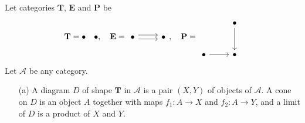 \begin{example}
Let categories  $\mathbf{T}$, $\mathbf{E}$ and $\mathbf{P}$ be
\begin{equation}
  \mathbf{T}={\bullet \quad \bullet},\quad \mathbf{E}=
  \begin{tikzcd}
    \bullet\arrow[r,shift left]\arrow[r,shift right]   &\bullet
  \end{tikzcd},\quad \mathbf{P}=
  \begin{tikzcd}[row sep =large]
    & \bullet \arrow[d]\\
    \bullet \arrow[r] & \bullet
  \end{tikzcd}
\end{equation}
Let $\mathscr{A}$ be any category.
  \begin{enumerate}
    \item [(a)] A diagram $D$ of shape $\mathbf{T}$ in $\mathscr{A}$ is a pair $(X,Y)$ of objects of $\mathscr{A}$. A cone on  $D$ is an object $A$ together with maps $f_1:A\to X$ and $f_2:A\to Y$, and a limit of $D$ is a product of $X$ and $Y$. 


\end{enumerate}
\end{example}
